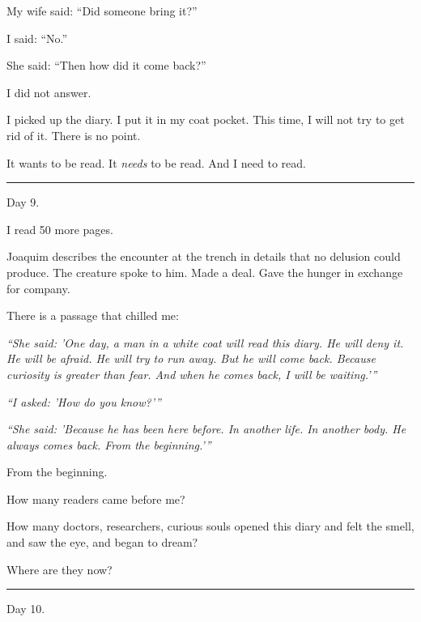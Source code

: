 \noindent My wife said: \textquotedblleft{}Did someone bring it?\textquotedblright{}

\noindent I said: \textquotedblleft{}No.\textquotedblright{}

\noindent She said: \textquotedblleft{}Then how did it come back?\textquotedblright{}

\noindent I did not answer.

\noindent I picked up the diary. I put it in my coat pocket. This time, I will not try to get rid of it. There is no point.

\noindent It wants to be read.
It \textit{needs} to be read.
And I need to read.

\vspace{0.5em}\noindent\rule{\textwidth}{0.5pt}\vspace{0.5em}

\noindent Day 9.

\noindent I read 50 more pages.

\noindent Joaquim describes the encounter at the trench in details that no delusion could produce. The creature spoke to him. Made a deal. Gave the hunger in exchange for company.

\noindent There is a passage that chilled me:

\noindent \textit{\textquotedblleft{}She said: 'One day, a man in a white coat will read this diary. He will deny it. He will be afraid. He will try to run away. But he will come back. Because curiosity is greater than fear. And when he comes back, I will be waiting.'\textquotedblright{}}

\noindent \textit{\textquotedblleft{}I asked: 'How do you know?'\textquotedblright{}}

\noindent \textit{\textquotedblleft{}She said: 'Because he has been here before. In another life. In another body. He always comes back. From the beginning.'\textquotedblright{}}

\noindent From the beginning.

\noindent How many readers came before me?

\noindent How many doctors, researchers, curious souls opened this diary and felt the smell, and saw the eye, and began to dream?

\noindent Where are they now?

\vspace{0.5em}\noindent\rule{\textwidth}{0.5pt}\vspace{0.5em}

\noindent Day 10.

